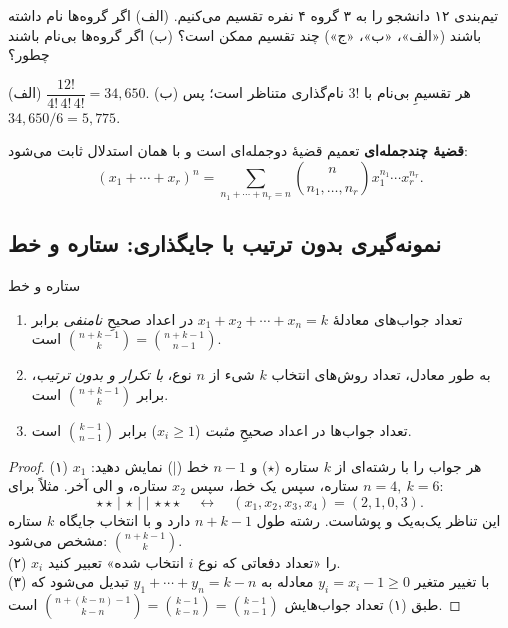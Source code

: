 \begin{example}{تیم‌بندی}
۱۲ دانشجو را به ۳ گروه ۴ نفره تقسیم می‌کنیم. (الف) اگر گروه‌ها نام داشته باشند («الف»، «ب»، «ج») چند تقسیم ممکن است؟ (ب) اگر گروه‌ها بی‌نام باشند چطور؟
\begin{solution}
(الف) $\dfrac{12!}{4!\,4!\,4!}=34{,}650$. \quad
(ب) هر تقسیمِ بی‌نام با $3!$ نام‌گذاری متناظر است؛ پس $34{,}650/6=5{,}775$.
\end{solution}
\end{example}

\begin{note}
\textbf{قضیهٔ چندجمله‌ای} تعمیم قضیهٔ دوجمله‌ای است و با همان استدلال ثابت می‌شود:
\[ (x_1+\cdots+x_r)^n=\sum_{n_1+\cdots+n_r=n}\binom{n}{n_1,\dots,n_r}x_1^{n_1}\cdots x_r^{n_r}. \]
\end{note}

\subsection{نمونه‌گیری بدون ترتیب با جایگذاری: ستاره و خط}

\begin{theorem}[label=thm:stars-bars]{ستاره و خط}
\begin{enumerate}
  \item تعداد جواب‌های معادلهٔ $x_1+x_2+\cdots+x_n=k$ در اعداد صحیحِ \emph{نامنفی} برابر $\binom{n+k-1}{k}=\binom{n+k-1}{n-1}$ است.
  \item به طور معادل، تعداد روش‌های انتخاب $k$ شیء از $n$ نوع، \emph{با تکرار و بدون ترتیب}، برابر $\binom{n+k-1}{k}$ است.
  \item تعداد جواب‌ها در اعداد صحیحِ \emph{مثبت} ($x_i\ge1$) برابر $\binom{k-1}{n-1}$ است.
\end{enumerate}
\end{theorem}

\begin{proof}
(۱) هر جواب را با رشته‌ای از $k$ ستاره ($\star$) و $n-1$ خط ($|$) نمایش دهید: $x_1$ ستاره، سپس یک خط، سپس $x_2$ ستاره، و الی آخر. مثلاً برای $n=4,\ k=6$:
\[ \star\star\,|\,\star\,|\,\,|\,\star\star\star \quad\longleftrightarrow\quad (x_1,x_2,x_3,x_4)=(2,1,0,3). \]
این تناظر یک‌به‌یک و پوشاست. رشته طول $n+k-1$ دارد و با انتخاب جایگاه $k$ ستاره مشخص می‌شود: $\binom{n+k-1}{k}$.\\
(۲) $x_i$ را «تعداد دفعاتی که نوع $i$ انتخاب شده» تعبیر کنید.\\
(۳) با تغییر متغیر $y_i=x_i-1\ge0$ معادله به $y_1+\cdots+y_n=k-n$ تبدیل می‌شود که طبق (۱) تعداد جواب‌هایش $\binom{n+(k-n)-1}{k-n}=\binom{k-1}{k-n}=\binom{k-1}{n-1}$ است.
\end{proof}

